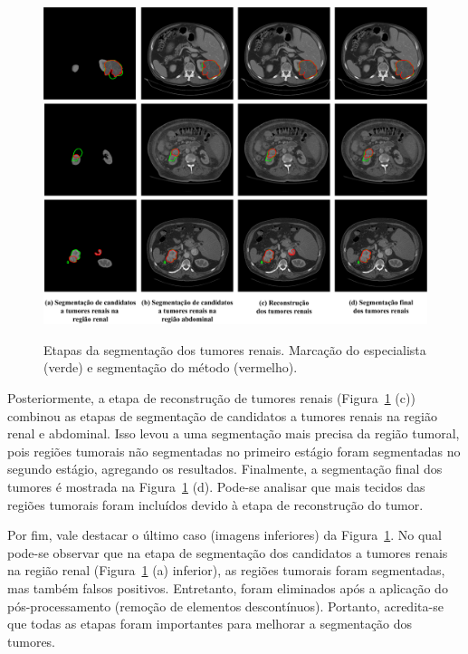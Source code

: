 \begin{figure}[!ht]
    \centering
    \caption{Etapas da segmentação dos tumores renais. Marcação do especialista (verde) e segmentação do método (vermelho).}
    \includegraphics[width=1\textwidth]{figuras/res-seg-tumores-renais-final.pdf}
    \label{fig:res-final-tumores-renais}
\end{figure}
\FloatBarrier

Posteriormente, a etapa de reconstrução de tumores renais (Figura~\ref{fig:res-final-tumores-renais} (c)) combinou as etapas de segmentação de candidatos a tumores renais na região renal e abdominal. Isso levou a uma segmentação mais precisa da região tumoral, pois regiões tumorais não segmentadas no primeiro estágio foram segmentadas no segundo estágio, agregando os resultados. Finalmente, a segmentação final dos tumores é mostrada na Figura~\ref{fig:res-final-tumores-renais} (d). Pode-se analisar que mais tecidos das regiões tumorais foram incluídos devido à etapa de reconstrução do tumor.

Por fim, vale destacar o último caso (imagens inferiores) da Figura~\ref{fig:res-final-tumores-renais}. No qual pode-se observar que na etapa de segmentação dos candidatos a tumores renais na região renal (Figura~\ref{fig:res-final-tumores-renais} (a) inferior), as regiões tumorais foram segmentadas, mas também falsos positivos. Entretanto, foram eliminados após a aplicação do pós-processamento (remoção de elementos descontínuos). Portanto, acredita-se que todas as etapas foram importantes para melhorar a segmentação dos tumores.

